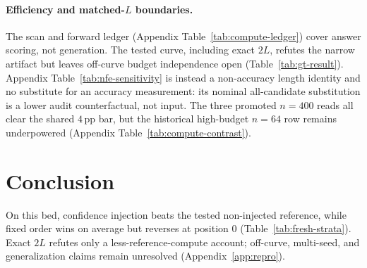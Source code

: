 \documentclass{article}
\newcommand{\pp}{\,\mathrm{pp}}
\begin{document}
\paragraph{Efficiency and matched-$L$ boundaries.}
The scan and forward ledger (Appendix Table~\ref{tab:compute-ledger}) cover
answer scoring, not generation.  The tested
curve, including exact $2L$, refutes the narrow artifact but leaves off-curve
budget independence open (Table~\ref{tab:gt-result}).  Appendix
Table~\ref{tab:nfe-sensitivity} is instead a non-accuracy length identity and
no substitute for an accuracy measurement: its nominal all-candidate
substitution is a lower audit counterfactual, not input.  The three promoted
$n{=}400$ reads all clear the shared $4\pp$ bar, but the historical high-budget
$n=64$ row remains underpowered (Appendix Table~\ref{tab:compute-contrast}).

\section{Conclusion}
On this bed, confidence injection beats the tested non-injected reference,
while fixed order wins on average but reverses at position 0
(Table~\ref{tab:fresh-strata}).  Exact $2L$ refutes only a
less-reference-compute account; off-curve, multi-seed, and generalization
claims remain unresolved (Appendix~\ref{app:repro}).

\label{p5:main-text-end}



\appendix
\raggedbottom

\end{document}
